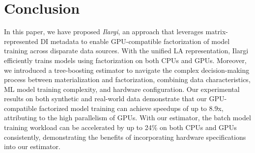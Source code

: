 \vspace{-4mm}
\section{Conclusion}
\label{sec:con}
\vspace{-2mm}
In this paper, we have proposed \emph{Ilargi}, an approach that leverages matrix-represented DI metadata to enable GPU-compatible factorization of model training across disparate data sources. With the unified LA representation, Ilargi efficiently trains models using factorization on both CPUs and GPUs. Moreover, we introduced a tree-boosting estimator to navigate the complex decision-making process between materialization and factorization, combining data characteristics, ML model training complexity, and hardware configuration.
Our experimental results on both synthetic and real-world data demonstrate that our GPU-compatible factorized model training can achieve speedups of up to 8.9x, attributing to the high parallelism of GPUs. 
With our estimator, the batch model training workload can be accelerated by up to 24\% on both CPUs and GPUs consistently, demonstrating the benefits of incorporating hardware specifications into our estimator.










